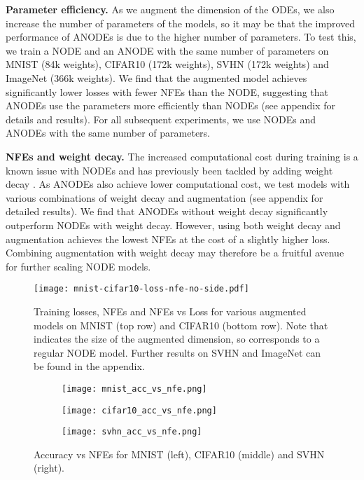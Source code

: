 \documentclass{article}
\begin{document}
\textbf{Parameter efficiency.} As we augment the dimension of the ODEs, we also increase the number of parameters of the models, so it may be that the improved performance of ANODEs is due to the higher number of parameters. To test this, we train a NODE and an ANODE with the same number of parameters on MNIST (84k weights), CIFAR10 (172k weights), SVHN (172k weights) and  ImageNet (366k weights). We find that the augmented model achieves significantly lower losses with fewer NFEs than the NODE, suggesting that ANODEs use the parameters more efficiently than NODEs (see appendix for details and results). For all subsequent experiments, we use NODEs and ANODEs with the same number of parameters.

\textbf{NFEs and weight decay.} The increased computational cost during training is a known issue with NODEs and has previously been tackled by adding weight decay \citep{grathwohl2018ffjord}. As ANODEs also achieve lower computational cost, we test models with various combinations of weight decay and augmentation (see appendix for detailed results). We find that ANODEs without weight decay significantly outperform NODEs with weight decay. However, using both weight decay and augmentation achieves the lowest NFEs at the cost of a slightly higher loss. Combining augmentation with weight decay may therefore be a fruitful avenue for further scaling NODE models.

\begin{figure}[t]
\begin{center}
\texttt{[image: mnist-cifar10-loss-nfe-no-side.pdf]}
\end{center}
\setlength{\abovecaptionskip}{-5pt}
\setlength{\belowcaptionskip}{-10pt}
\caption{Training losses, NFEs and NFEs vs Loss for various augmented models on MNIST (top row) and CIFAR10 (bottom row). Note that  indicates the size of the augmented dimension, so  corresponds to a regular NODE model. Further results on SVHN and  ImageNet can be found in the appendix.}
\label{img-losses-nfes}
\end{figure}

\begin{figure}[b]
\centering
\begin{subfigure}[t]{0.32\linewidth}
\centering
\texttt{[image: mnist\_acc\_vs\_nfe.png]}
\end{subfigure}
\begin{subfigure}[t]{0.32\linewidth}
\centering
\texttt{[image: cifar10\_acc\_vs\_nfe.png]}
\end{subfigure}
\begin{subfigure}[t]{0.32\linewidth}
\centering
\texttt{[image: svhn\_acc\_vs\_nfe.png]}
\end{subfigure}
\caption{Accuracy vs NFEs for MNIST (left), CIFAR10 (middle) and SVHN (right).}
\label{acc-vs-nfe}
\end{figure}
\end{document}
